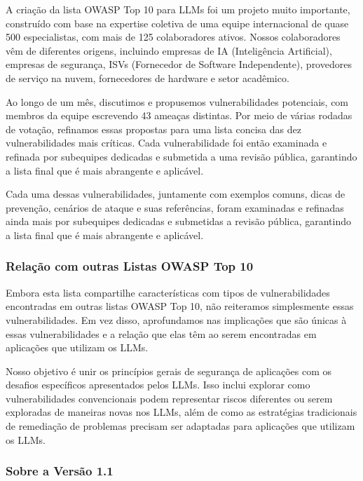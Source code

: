 \documentclass[
]{article}
\begin{document}
A criação da lista OWASP Top 10 para LLMs foi um projeto muito
importante, construído com base na expertise coletiva de uma equipe
internacional de quase 500 especialistas, com mais de 125 colaboradores
ativos. Nossos colaboradores vêm de diferentes origens, incluindo
empresas de IA (Inteligência Artificial), empresas de segurança, ISVs
(Fornecedor de Software Independente), provedores de serviço na nuvem,
fornecedores de hardware e setor acadêmico.

Ao longo de um mês, discutimos e propusemos vulnerabilidades potenciais,
com membros da equipe escrevendo 43 ameaças distintas. Por meio de
várias rodadas de votação, refinamos essas propostas para uma lista
concisa das dez vulnerabilidades mais críticas. Cada vulnerabilidade foi
então examinada e refinada por subequipes dedicadas e submetida a uma
revisão pública, garantindo a lista final que é mais abrangente e
aplicável.

Cada uma dessas vulnerabilidades, juntamente com exemplos comuns, dicas
de prevenção, cenários de ataque e suas referências, foram examinadas e
refinadas ainda mais por subequipes dedicadas e submetidas a revisão
pública, garantindo a lista final que é mais abrangente e aplicável.

\subsubsection{Relação com outras Listas OWASP Top
10}\label{relauxe7uxe3o-com-outras-listas-owasp-top-10}

Embora esta lista compartilhe características com tipos de
vulnerabilidades encontradas em outras listas OWASP Top 10, não
reiteramos simplesmente essas vulnerabilidades. Em vez disso,
aprofundamos nas implicações que são únicas à essas vulnerabilidades e a
relação que elas têm ao serem encontradas em aplicações que utilizam os
LLMs.

Nosso objetivo é unir os princípios gerais de segurança de aplicações
com os desafios específicos apresentados pelos LLMs. Isso inclui
explorar como vulnerabilidades convencionais podem representar riscos
diferentes ou serem exploradas de maneiras novas nos LLMs, além de como
as estratégias tradicionais de remediação de problemas precisam ser
adaptadas para aplicações que utilizam os LLMs.

\subsubsection{Sobre a Versão 1.1}\label{sobre-a-versuxe3o-1.1}
\end{document}
